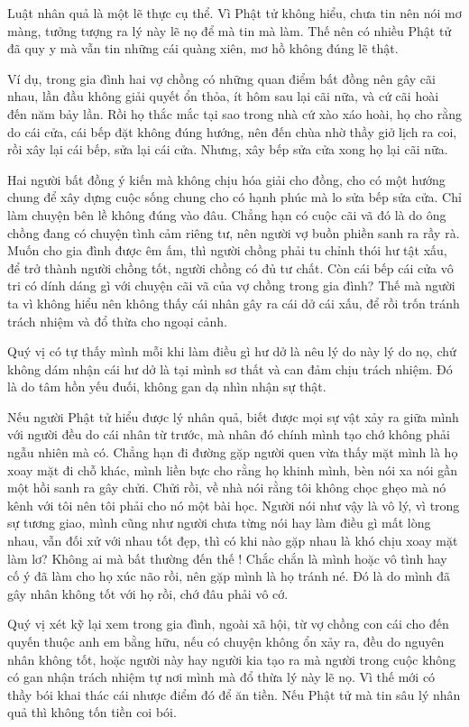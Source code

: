 \documentclass[
  12pt,
  oneside]{book}
\begin{document}
Luật nhân quả là một lẽ thực cụ thể. Vì Phật tử không hiểu, chưa tin nên nói mơ màng, tưởng tượng ra lý này lẽ nọ để mà tin mà làm. Thế nên có nhiều Phật tử đã quy y mà vẫn tin những cái quàng xiên, mơ hồ không đúng lẽ thật.

Ví dụ, trong gia đình hai vợ chồng có những quan điểm bất đồng nên gây cãi nhau, lần đầu không giải quyết ổn thỏa, ít hôm sau lại cãi nữa, và cứ cãi hoài đến năm bảy lần. Rồi họ thắc mắc tại sao trong nhà cứ xào xáo hoài, họ cho rằng do cái cửa, cái bếp đặt không đúng hướng, nên đến chùa nhờ thầy giở lịch ra coi, rồi xây lại cái bếp, sửa lại cái cửa. Nhưng, xây bếp sửa cửa xong họ lại cãi nữa.

Hai người bất đồng ý kiến mà không chịu hóa giải cho đồng, cho có một hướng chung để xây dựng cuộc sống chung cho có hạnh phúc mà lo sửa bếp sửa cửa. Chỉ làm chuyện bên lề không đúng vào đâu. Chẳng hạn có cuộc cãi vã đó là do ông chồng đang có chuyện tình cảm riêng tư, nên người vợ buồn phiền sanh ra rầy rà. Muốn cho gia đình được êm ấm, thì người chồng phải tu chỉnh thói hư tật xấu, để trở thành người chồng tốt, người chồng có đủ tư chất. Còn cái bếp cái cửa vô tri có dính dáng gì với chuyện cãi vã của vợ chồng trong gia đình? Thế mà người ta vì không hiểu nên không thấy cái nhân gây ra cái dở cái xấu, để rồi trốn tránh trách nhiệm và đổ thừa cho ngoại cảnh.

Quý vị có tự thấy mình mỗi khi làm điều gì hư dở là nêu lý do này lý do nọ, chứ không dám nhận cái hư dở là tại mình sơ thất và can đảm chịu trách nhiệm. Đó là do tâm hồn yếu đuối, không gan dạ nhìn nhận sự thật.

Nếu người Phật tử hiểu được lý nhân quả, biết được mọi sự vật xảy ra giữa mình với người đều do cái nhân từ trước, mà nhân đó chính mình tạo chớ không phải ngẫu nhiên mà có. Chẳng hạn đi đường gặp người quen vừa thấy mặt mình là họ xoay mặt đi chỗ khác, mình liền bực cho rằng họ khinh mình, bèn nói xa nói gần một hồi sanh ra gây chửi. Chửi rồi, về nhà nói rằng tôi không chọc ghẹo mà nó kênh với tôi nên tôi phải cho nó một bài học. Người nói như vậy là vô lý, vì trong sự tương giao, mình cũng như người chưa từng nói hay làm điều gì mất lòng nhau, vẫn đối xử với nhau tốt đẹp, thì có khi nào gặp nhau là khó chịu xoay mặt làm lơ? Không ai mà bất thường đến thế ! Chắc chắn là mình hoặc vô tình hay cố ý đã làm cho họ xúc não rồi, nên gặp mình là họ tránh né. Đó là do mình đã gây nhân không tốt với họ rồi, chớ đâu phải vô cớ.

Quý vị xét kỹ lại xem trong gia đình, ngoài xã hội, từ vợ chồng con cái cho đến quyến thuộc anh em bằng hữu, nếu có chuyện không ổn xảy ra, đều do nguyên nhân không tốt, hoặc người này hay người kia tạo ra mà người trong cuộc không có gan nhận trách nhiệm tự nơi mình mà đổ thừa lý này lẽ nọ. Vì thế mới có thầy bói khai thác cái nhược điểm đó để ăn tiền. Nếu Phật tử mà tin sâu lý nhân quả thì không tốn tiền coi bói.
\end{document}
